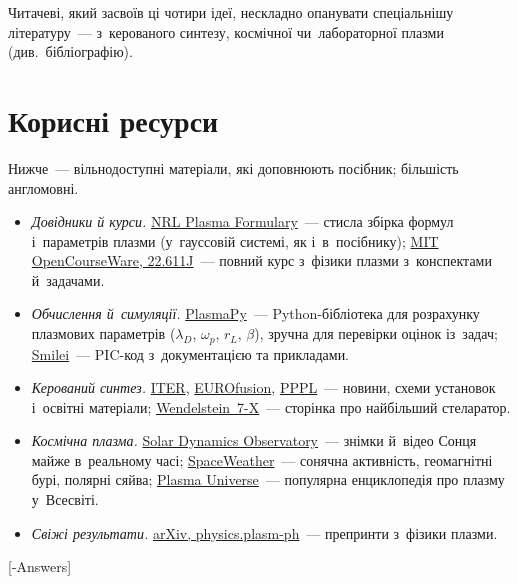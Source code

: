 \documentclass[biblatex]{ConspectBook}
\begin{document}
Читачеві, який засвоїв ці чотири ідеї, нескладно опанувати спеціальнішу літературу~--- з~керованого синтезу, космічної
чи~лабораторної плазми (див.~бібліографію).

\section*{Корисні ресурси}

Нижче~--- вільнодоступні матеріали, які доповнюють посібник; більшість англомовні.

\begin{itemize}
	\item \emph{Довідники й курси.}
	  \href{https://www.nrl.navy.mil/News-Media/Publications/NRL-Plasma-Formulary/}{NRL Plasma Formulary}~--- стисла збірка формул
	  і~параметрів плазми (у~гауссовій системі, як і~в~посібнику);
	  \href{https://ocw.mit.edu/courses/22-611j-introduction-to-plasma-physics-i-fall-2003/}{MIT OpenCourseWare, 22.611J}~--- повний курс
	  з~фізики плазми з~конспектами й~задачами.
	\item \emph{Обчислення й~симуляції.}
	  \href{https://www.plasmapy.org}{PlasmaPy}~--- Python-бібліотека для розрахунку плазмових параметрів ($\lambda_D$, $\omega_p$, $r_L$, $\beta$),
	  зручна для перевірки оцінок із~задач;
	  \href{https://smileipic.github.io/Smilei/}{Smilei}~--- PIC-код з~документацією та прикладами.
	\item \emph{Керований синтез.}
	  \href{https://www.iter.org}{ITER},
	  \href{https://www.euro-fusion.org}{EUROfusion},
	  \href{https://www.pppl.gov}{PPPL}~--- новини, схеми установок і~освітні матеріали;
	  \href{https://www.ipp.mpg.de/w7x}{Wendelstein~7-X}~--- сторінка про найбільший стеларатор.
	\item \emph{Космічна плазма.}
	  \href{https://sdo.gsfc.nasa.gov}{Solar Dynamics Observatory}~--- знімки й~відео Сонця майже в~реальному часі;
	  \href{https://www.spaceweather.com}{SpaceWeather}~--- сонячна активність, геомагнітні бурі, полярні сяйва;
	  \href{https://www.plasma-universe.com}{Plasma Universe}~--- популярна енциклопедія про плазму у~Всесвіті.
	\item \emph{Свіжі результати.}
	  \href{https://arxiv.org/list/physics.plasm-ph/recent}{arXiv, physics.plasm-ph}~--- препринти з~фізики плазми.
\end{itemize}

%
%
\answers
{}[-Answers]
\end{document}
